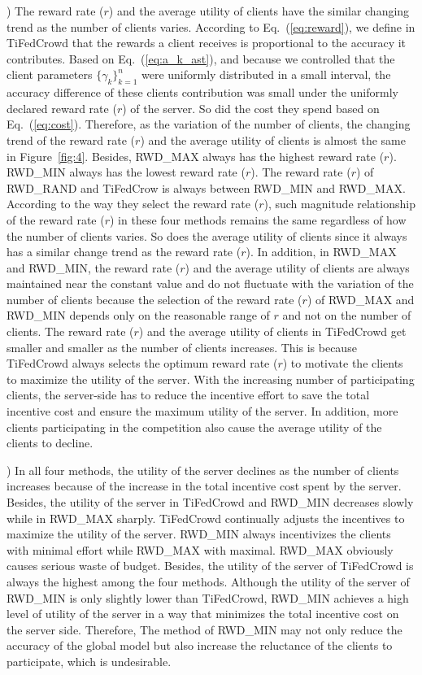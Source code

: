 \documentclass[final,1p,times]{elsarticle}
\begin{document}
 \lowercase{}) The reward rate ($r$) and the average utility of clients have the similar changing trend as the number of clients varies. According to Eq.~(\ref{eq:reward}), we define in TiFedCrowd that the rewards a client receives is proportional to the accuracy it contributes. Based on Eq.~(\ref{eq:a_k_ast}), and because we controlled that the client parameters $\{\gamma_k\}_{k=1}^n$ were uniformly distributed in a small interval, the accuracy difference of these clients contribution was small under the uniformly declared reward rate ($r$) of the server. So did the cost they spend based on Eq.~(\ref{eq:cost}). Therefore, as the variation of the number of clients, the changing trend of the reward rate ($r$) and the average utility of clients is almost the same in Figure~\ref{fig:4}. Besides, RWD\_MAX always has the highest reward rate ($r$). RWD\_MIN always has the lowest reward rate ($r$). The reward rate ($r$) of RWD\_RAND and TiFedCrow is always between RWD\_MIN and RWD\_MAX. According to the way they select the reward rate ($r$), such magnitude relationship of the reward rate ($r$) in these four methods remains the same regardless of how the number of clients varies. So does the average utility of clients since it always has a similar change trend as the reward rate ($r$). In addition, in RWD\_MAX and RWD\_MIN, the reward rate ($r$) and the average utility of clients are always maintained near the constant value and do not fluctuate with the variation of the number of clients because the selection of the reward rate ($r$) of RWD\_MAX and RWD\_MIN depends only on the reasonable range of $r$ and not on the number of clients. The reward rate ($r$) and the average utility of clients in TiFedCrowd get smaller and smaller as the number of clients increases. This is because TiFedCrowd always selects the optimum reward rate ($r$) to motivate the clients to maximize the utility of the server. With the increasing number of participating clients, the server-side has to reduce the incentive effort to save the total incentive cost and ensure the maximum utility of the server. In addition, more clients participating in the competition also cause the average utility of the clients to decline. 
 
 \lowercase{}) In all four methods, the utility of the server declines as the number of clients increases because of the increase in the total incentive cost spent by the server. Besides, the utility of the server in TiFedCrowd and RWD\_MIN decreases slowly while in RWD\_MAX sharply. TiFedCrowd continually adjusts the incentives to maximize the utility of the server. RWD\_MIN always incentivizes the clients with minimal effort while RWD\_MAX with maximal. RWD\_MAX obviously causes serious waste of budget. Besides, the utility of the server of TiFedCrowd is always the highest among the four methods. Although the utility of the server of RWD\_MIN is only slightly lower than TiFedCrowd, RWD\_MIN achieves a high level of utility of the server in a way that minimizes the total incentive cost on the server side. Therefore, The method of RWD\_MIN may not only reduce the accuracy of the global model but also increase the reluctance of the clients to participate, which is undesirable.
 
\end{document}
